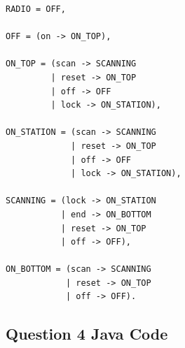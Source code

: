 \documentclass{article}[8pt]
\begin{document}
\begin{lstlisting}
RADIO = OFF,

OFF = (on -> ON_TOP),

ON_TOP = (scan -> SCANNING
         | reset -> ON_TOP
         | off -> OFF
         | lock -> ON_STATION),

ON_STATION = (scan -> SCANNING
             | reset -> ON_TOP
             | off -> OFF
             | lock -> ON_STATION),

SCANNING = (lock -> ON_STATION
           | end -> ON_BOTTOM
           | reset -> ON_TOP
           | off -> OFF),

ON_BOTTOM = (scan -> SCANNING
            | reset -> ON_TOP
            | off -> OFF).

\end{lstlisting}

\subsection{Question 4 Java Code}
\end{document}
